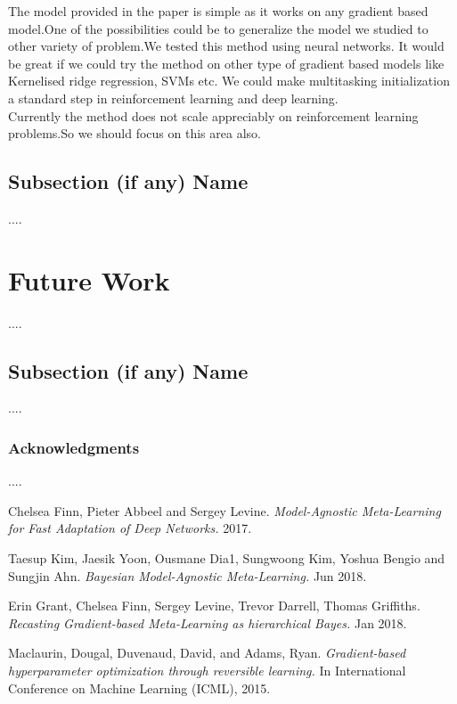 \documentclass[a4paper]{article}
\begin{document}
The model provided in the paper is simple as it works on any gradient based model.One of the possibilities could be to generalize the model we studied  to other variety of problem.We tested this method using neural networks. It would be great if we could try the method on other type of gradient based models like Kernelised ridge regression, SVMs etc. We could make multitasking initialization a standard step in reinforcement learning and deep learning.\\
Currently the method does not scale appreciably on reinforcement learning problems.So we should focus on this area also.

\subsection*{Subsection (if any) Name}

....

\section*{Future Work}

....

\subsection*{Subsection (if any) Name}

....

\subsubsection*{Acknowledgments}

....
\pagebreak
\begin{thebibliography}{9}
Chelsea Finn, Pieter Abbeel and Sergey Levine.
\textit{Model-Agnostic Meta-Learning for Fast Adaptation of Deep Networks.}
2017.

Taesup Kim, Jaesik Yoon, Ousmane Dia1, Sungwoong Kim, Yoshua Bengio and Sungjin Ahn.
\textit{Bayesian Model-Agnostic Meta-Learning.}
Jun 2018.

Erin Grant, Chelsea Finn, Sergey Levine, Trevor Darrell, Thomas Griffiths.
\textit{Recasting Gradient-based Meta-Learning as hierarchical Bayes.}
Jan 2018.

Maclaurin, Dougal, Duvenaud, David, and Adams, Ryan.
\textit{Gradient-based hyperparameter optimization through reversible learning.}
In International Conference on Machine Learning (ICML), 2015.
\end{thebibliography}
\end{document}
